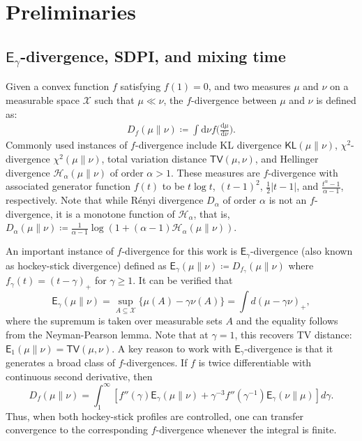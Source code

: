 \documentclass[10pt, journal]{IEEEtran}
\newcommand{\sE}{\mathsf{E}}
\begin{document}
\section{Preliminaries} \label{sec:preliminaries} 

\subsection{\texorpdfstring{$\mathsf E_\gamma$}{Egamma}-divergence, SDPI, and mixing time} 
Given a convex function $f$ satisfying $f(1)=0$, and two measures $\mu$ and $\nu$ on a measurable space $\mathcal X$  such that $\mu \ll \nu$, the $f$-divergence between $\mu$ and $\nu$ is defined as:
\begin{align}
    D_f(\mu\|\nu)\coloneqq \int \text{d}\nu f\Big(\frac{\text{d}\mu}{\text{d}\nu}\Big).
\end{align}
Commonly used instances of $f$-divergence include KL divergence $\mathsf{KL}(\mu\|\nu)$, $\chi^2$-divergence $\chi^2(\mu\|\nu)$, total variation distance $\mathsf{TV}(\mu, \nu)$, and Hellinger divergence $\mathcal{H}_\alpha(\mu\|\nu)$ of order $\alpha>1$. These measures are $f$-divergence with associated generator function $f(t)$ to be $t\log t$, $(t-1)^2$, $\frac{1}{2}|t-1|$, and $\frac{t^\alpha - 1}{\alpha - 1}$, respectively. Note that while R\'enyi divergence $D_\alpha$ of order $\alpha$ is not an $f$-divergence, it is a monotone function of $\mathcal{H}_\alpha$, that is,   $D_\alpha(\mu\|\nu)\coloneqq \frac{1}{\alpha - 1} \log\left(1+ (\alpha - 1)\mathcal{H}_\alpha(\mu \parallel \nu)\right)$.

An important instance of $f$-divergence for this work is $\sE_\gamma$-divergence (also known as hockey-stick divergence) defined as $\sE_\gamma(\mu\|\nu)\coloneqq D_{f_\gamma}(\mu\|\nu)$ where $f_\gamma(t) = (t-\gamma)_+$ for $\gamma\geq 1$. It can be verified that 
$$\mathsf E_\gamma(\mu\|\nu)=\sup_{A\subseteq\mathcal X}\{\mu(A)-\gamma\nu(A)\} = \int d(\mu-\gamma\nu)_+,$$
where the supremum is taken over measurable sets $A$ and the equality follows from the Neyman-Pearson lemma. 
Note that at $\gamma=1$, this recovers TV distance: $\mathsf E_1(\mu\|\nu)=\mathsf{TV}(\mu,\nu)$. A key reason to work with $\mathsf E_\gamma$-divergence is that it generates a broad class of $f$-divergences. If $f$ is twice differentiable with continuous second derivative, then \cite[Corollary~3.7]{cohen1998comparisons} \begin{equation}\label{f_representation} D_f(\mu\|\nu)=\int_1^\infty\left[f''(\gamma)\mathsf E_\gamma(\mu\|\nu)+\gamma^{-3}f''(\gamma^{-1})\mathsf E_\gamma(\nu\|\mu)\right]d\gamma. \end{equation} Thus, when both hockey-stick profiles are controlled, one can transfer convergence to the corresponding $f$-divergence whenever the integral is finite. 
\end{document}
